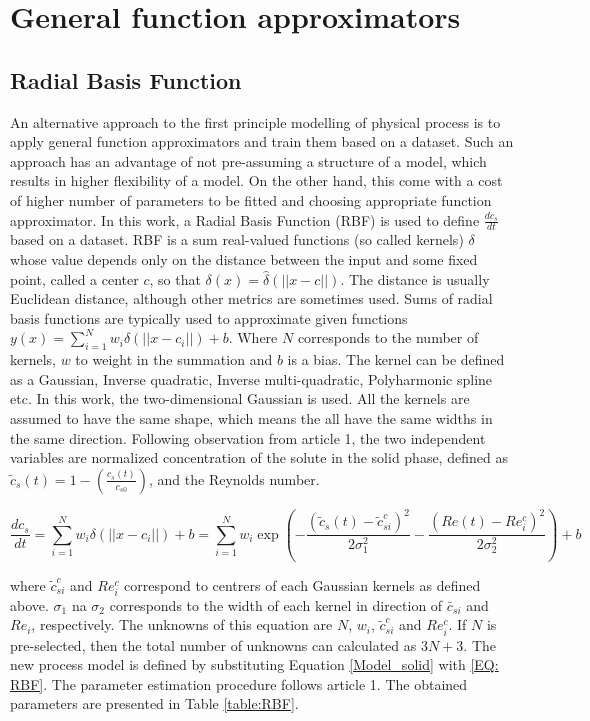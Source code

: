 \documentclass[../Article_Model_Parameters.tex]{subfiles}
\begin{document}
	
	\section{General function approximators} \label{CH: RBF}
	
	\subsection{Radial Basis Function}
	
	An alternative approach to the first principle modelling of physical process is to apply general function approximators and train them based on a dataset. Such an approach has an advantage of not pre-assuming a structure of a model, which results in higher flexibility of a model. On the other hand, this come with a cost of higher number of parameters to be fitted and choosing appropriate function approximator. In this work, a Radial Basis Function (RBF) is used to define $\frac{dc_s}{dt}$ based on a dataset. RBF is a sum real-valued functions (so called kernels) $\delta$ whose value depends only on the distance between the input and some fixed point, called a center $c$, so that $\delta(x) = \hat{\delta}(||x-c||)$. The distance is usually Euclidean distance, although other metrics are sometimes used. Sums of radial basis functions are typically used to approximate given functions $y(x) = \sum_{i=1}^{N} w_i \delta(||x-c_i||) + b$. Where $N$ corresponds to the number of kernels, $w$ to weight in the summation and $b$ is a bias. The kernel can be defined as a Gaussian, Inverse quadratic, Inverse multi-quadratic, Polyharmonic spline etc. In this work, the two-dimensional Gaussian is used. All the kernels are assumed to have the same shape, which means the all have the same widths in the same direction.
	Following observation from {\color{red}article 1}, the two independent variables are normalized concentration of the solute in the solid phase, defined as $\tilde{c}_s(t) = 1 - \left(\frac{c_s(t)}{c_{s0}}\right)$, and the Reynolds number.
	
	{\footnotesize
		\begin{equation} \label{EQ: RBF}
			\frac{dc_s}{dt} = \sum_{i=1}^{N} w_i \delta(||x-c_i||) + b = \sum_{i=1}^{N} w_i \exp \left( - \frac{ \left( \tilde{c}_s(t)-\tilde{c}_{si}^c \right)^2 }{2\sigma_1^2} - \frac{ \left( Re(t)-Re_i^c \right)^2 }{2\sigma_2^2} \right) + b
		\end{equation}
	}
	
	where $\tilde{c}_{si}^c$ and $Re_i^c$ correspond to centrers of each Gaussian kernels as defined above. $\sigma_1$ na $\sigma_2$ corresponds to the width of each kernel in direction of $\bar{c}_{si}$ and $Re_i$, respectively. The unknowns of this equation are $N$, $w_i$, $\tilde{c}_{si}^c$ and $Re_i^c$. If $N$ is pre-selected, then the total number of unknowns can calculated as $3N+3$. The new process model is defined by substituting Equation \ref{Model_solid} with \ref{EQ: RBF}. The parameter estimation procedure follows {\color{red}article 1}. The obtained parameters are presented in Table \ref{table:RBF}.
	
\end{document}
